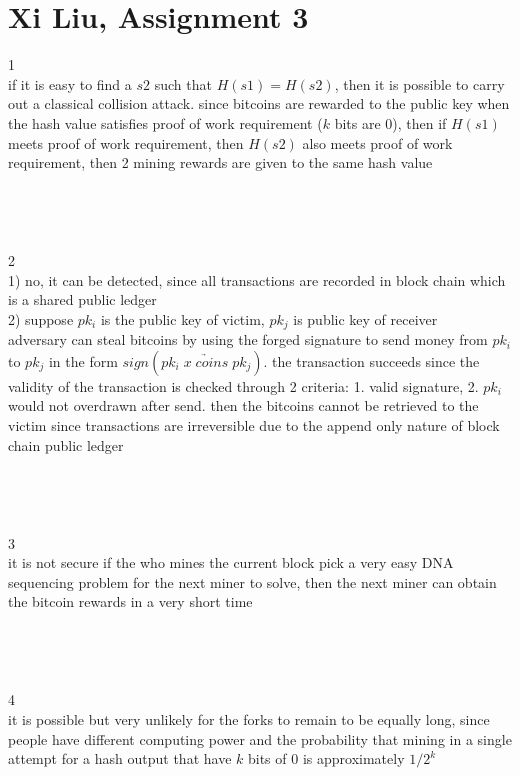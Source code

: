 \documentclass[12pt,border=4pt,multi]{article} %
\begin{document}
\section*{Xi Liu, Assignment 3}
1\\
if it is easy to find a $s2$ such that $H(s1) = H(s2)$, then it is possible to carry out a classical collision attack. since bitcoins are rewarded to the public key when the hash value satisfies proof of work requirement ($k$ bits are 0), then if $H(s1)$ meets proof of work requirement, then $H(s2)$ also meets proof of work requirement, then 2 mining rewards are given to the same hash value\\
\\
\\
\\
\\
2\\
1) no, it can be detected, since all transactions are recorded in block chain which is a shared public ledger\\
2) suppose $pk_i$ is the public key of victim, $pk_j$ is public key of receiver\\
adversary can steal bitcoins by using the forged signature to send money from $pk_i$ to $pk_j$ in the form $sign(pk_i\;\underrightarrow{x\;coins}\;pk_j)$. the transaction succeeds since the validity of the transaction is checked through 2 criteria: 1. valid signature, 2. $pk_i$ would not overdrawn after send. then the bitcoins cannot be retrieved to the victim since transactions are irreversible due to the append only nature of block chain public ledger\\
\\
\\
\\
\\
3\\
it is not secure if the who mines the current block pick a very easy DNA sequencing problem for the next miner to solve, then the next miner can obtain the bitcoin rewards in a very short time\\
\\
\\
\\
\\
4\\
it is possible but very unlikely for the forks to remain to be equally long, since people have different computing power and the probability that mining in a single attempt for a hash output that have $k$ bits of 0 is approximately $1 / 2^k$\\
\end{document}
